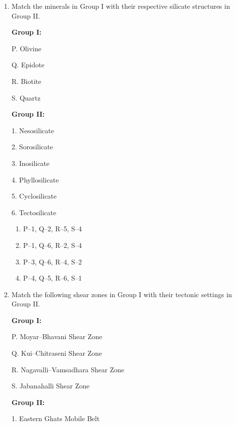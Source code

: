 \documentclass[journal,12pt,onecolumn]{IEEEtran}
\theoremstyle{remark}
\begin{document}
\begin{enumerate}[resume]
\item Match the minerals in Group I with their respective silicate structures in Group II.

\noindent
\begin{minipage}[t]{0.45\textwidth}
\textbf{Group I:}  

P. Olivine  

Q. Epidote  

R. Biotite  

S. Quartz  
\end{minipage}
\hfill
\begin{minipage}[t]{0.45\textwidth}
\textbf{Group II:}  

1. Nesosilicate  

2. Sorosilicate  

3. Inosilicate  

4. Phyllosilicate  

5. Cyclosilicate  

6. Tectosilicate  
\end{minipage}

\vspace{0.3cm}

\begin{multicols}{2}
\begin{enumerate}
\item P--1, Q--2, R--5, S--4  
\item P--1, Q--6, R--2, S--4  
\item P--3, Q--6, R--4, S--2  
\item P--4, Q--5, R--6, S--1  
\end{enumerate}
\end{multicols}
\vspace{0.5cm}

\item Match the following shear zones in Group I with their tectonic settings in Group II.

\noindent
\begin{minipage}[t]{0.45\textwidth}
\textbf{Group I:}  

P. Moyar--Bhavani Shear Zone  

Q. Kui--Chitraseni Shear Zone  

R. Nagavalli--Vamsadhara Shear Zone  

S. Jabanahalli Shear Zone  
\end{minipage}
\hfill
\begin{minipage}[t]{0.45\textwidth}
\textbf{Group II:}  

1. Eastern Ghats Mobile Belt  


\end{minipage}
\end{enumerate}
\end{document}
